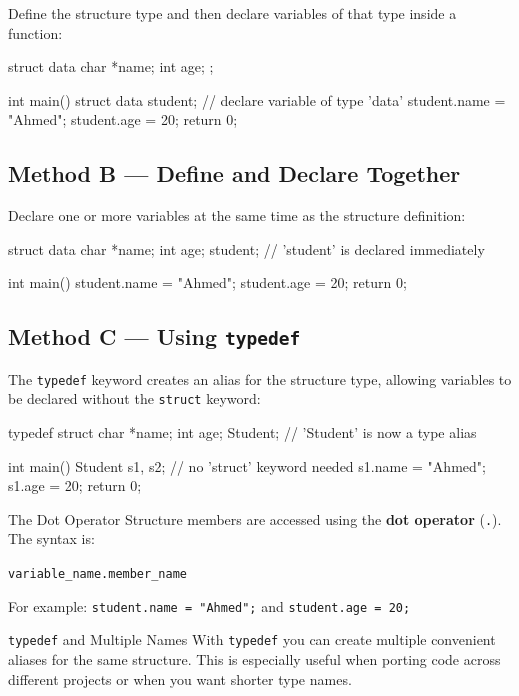 Define the structure type and then declare variables of that type
inside a function:

\begin{cppcode}
struct data {
    char *name;
    int age;
};

int main() {
    struct data student;      // declare variable of type 'data'
    student.name = "Ahmed";
    student.age  = 20;
    return 0;
}
\end{cppcode}

\subsection{Method B --- Define and Declare Together}

Declare one or more variables at the same time as the structure
definition:

\begin{cppcode}
struct data {
    char *name;
    int age;
} student;                   // 'student' is declared immediately

int main() {
    student.name = "Ahmed";
    student.age  = 20;
    return 0;
}
\end{cppcode}

\subsection{Method C --- Using \texttt{typedef}}

The \texttt{typedef} keyword creates an alias for the structure type,
allowing variables to be declared without the \texttt{struct} keyword:

\begin{cppcode}
typedef struct {
    char *name;
    int age;
} Student;                   // 'Student' is now a type alias

int main() {
    Student s1, s2;          // no 'struct' keyword needed
    s1.name = "Ahmed";
    s1.age  = 20;
    return 0;
}
\end{cppcode}

\begin{infobox}{The Dot Operator}
Structure members are accessed using the \textbf{dot operator}
(\texttt{.}).  The syntax is:

\medskip
\texttt{variable\_name.member\_name}
\medskip

For example: \texttt{student.name = "Ahmed";} and
\texttt{student.age = 20;}
\end{infobox}

\begin{conceptbox}{\texttt{typedef} and Multiple Names}
With \texttt{typedef} you can create multiple convenient aliases for
the same structure.  This is especially useful when porting code
across different projects or when you want shorter type names.
\end{conceptbox}

